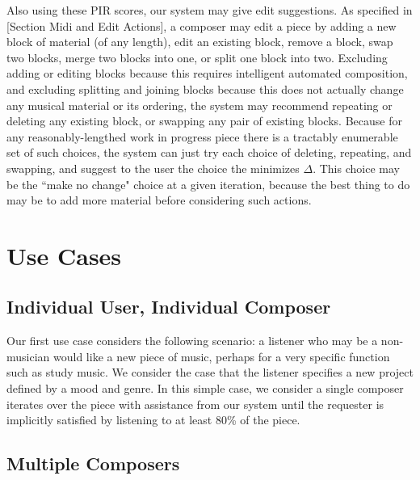 \documentclass[final,authoryear,5p,times,twocolumn]{elsarticle}
\begin{document}
Also using these PIR scores, our system may give edit suggestions. As specified in [Section Midi and Edit Actions], a composer may edit a piece by adding a new block of material (of any length), edit an existing block, remove a block, swap two blocks, merge two blocks into one, or split one block into two. Excluding adding or editing blocks because this requires intelligent automated composition, and excluding splitting and joining blocks because this does not actually change any musical material or its ordering, the system may recommend repeating or deleting any existing block, or swapping any pair of existing blocks. Because for any reasonably-lengthed work in progress piece there is a tractably enumerable set of such choices, the system can just try each choice of deleting, repeating, and swapping, and suggest to the user the choice the minimizes $\Delta$. This choice may be the ``make no change" choice at a given iteration, because the best thing to do may be to add more material before considering such actions.

\section{Use Cases}

\subsection{Individual User, Individual Composer}

Our first use case considers the following scenario: a listener who may be a non-musician would like a new piece of music, perhaps for a very specific function such as study music. We consider the case that the listener specifies a new project defined by a mood and genre. In this simple case, we consider a single composer iterates over the piece with assistance from our system until the requester is implicitly satisfied by listening to at least 80\% of the piece.

\subsection{Multiple Composers}
\end{document}
